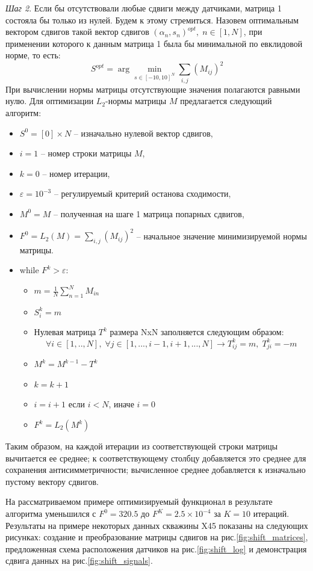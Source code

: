 \par
\textit{Шаг 2}. Если бы отсутствовали любые сдвиги между датчиками, матрица 1 состояла бы только из нулей. Будем к этому стремиться. Назовем оптимальным вектором сдвигов такой вектор сдвигов $(\alpha_n,s_n)^{opt},\;n\in[1,N]$, при применении которого к данным матрица 1 была бы минимальной по евклидовой норме, то есть:
\begin{equation}
    S^{opt}=\arg\min_{s\in[-10,10]^N}\sum_{i,j}(M_{ij})^2
\end{equation}
При вычислении нормы матрицы отсутствующие значения полагаются равными нулю.
Для оптимизации $L_2$-нормы матрицы $M$ предлагается следующий алгоритм:
\begin{itemize}
    \item[]$S^0=[0]\times N$ – изначально нулевой вектор сдвигов,
    \item[]$i=1$ – номер строки матрицы $M$,
    \item[]$k=0$ – номер итерации,
    \item[]$\varepsilon=10^{-3}$ – регулируемый критерий останова сходимости,
    \item[]$M^0=M$ – полученная на шаге 1 матрица попарных сдвигов,
    \item[]$F^0=L_2(M)=\sum_{i,j}(M_{ij})^2$ – начальное значение минимизируемой нормы матрицы.
    \item[] while $F^k>\varepsilon$:
    \begin{itemize}
        \item[]$m=\frac{1}{N}\sum_{n=1}^N M_{in}$ 
        \item[]$S_i^k=m$
        \item[]Нулевая матрица $T^k$  размера NxN заполняется следующим образом:
        $$\forall i\in[1,..,N],\;\forall j\in[1,...,i-1,i+1,...,N]\rightarrow T_{ij}^k=m,\; T_{ji}^k=-m$$
        \item[]$M^k=M^{k-1}-T^k$
        \item[]$k=k+1$
        \item[]$i=i+1$ если $i<N$, иначе $i=0$
        \item[]$F^k=L_2(M^k)$
    \end{itemize}
\end{itemize}
\par
Таким образом, на каждой итерации из соответствующей строки матрицы вычитается ее среднее; к соответствующему столбцу добавляется это среднее для сохранения антисимметричности; вычисленное среднее добавляется к изначально пустому вектору сдвигов.
\par
На рассматриваемом примере оптимизируемый функционал в результате алгоритма уменьшился с $F^0=320.5$ до $F^K=2.5\times 10^{-4}$ за $K=10$ итераций. Результаты на примере некоторых данных скважины X45 показаны на следующих рисунках: создание и преобразование матрицы сдвигов на рис.\ref{fig:shift_matrices}, предложенная схема расположения датчиков на рис.\ref{fig:shift_log} и демонстрация сдвига данных на рис.\ref{fig:shift_signals}.

